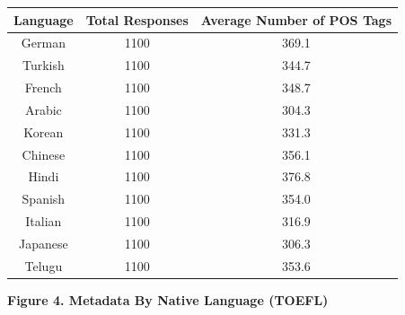 \documentclass[11pt,a4paper]{article}
\begin{document}
\begin{center}
	\begin{tabular}{|c|c|c|}
		\hline
		\textbf{Language} & \textbf{Total Responses} & \textbf{Average Number of POS Tags}\\
		\hline
		German & 1100 & 369.1\\
		\hline
		Turkish & 1100 & 344.7\\
		\hline
		French & 1100 & 348.7\\
		\hline
		Arabic & 1100& 304.3\\
		\hline
		Korean & 1100& 331.3\\
		\hline
		Chinese & 1100 & 356.1\\
		\hline
		Hindi & 1100& 376.8\\
		\hline
		Spanish & 1100 & 354.0\\
		\hline
		Italian & 1100 & 316.9\\
		\hline
		Japanese & 1100 & 306.3\\
		\hline
		Telugu & 1100 & 353.6\\
		\hline
	\end{tabular}
	\textbf{Figure 4. Metadata By Native Language (TOEFL)}
\end{center}
\end{document}
